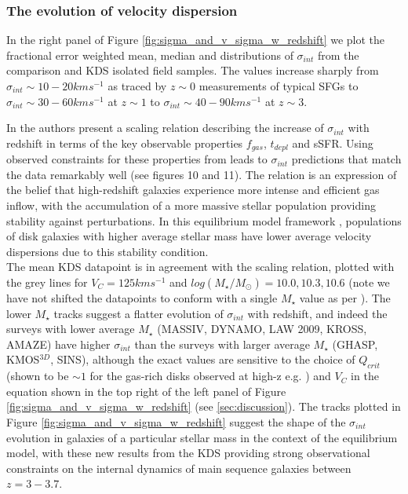 \documentclass[fleqn,usenatbib]{mn2e}
\begin{document}
\subsubsection{The evolution of velocity dispersion}\label{subsubsec:sigma_evolution}

In the right panel of Figure \ref{fig:sigma_and_v_sigma_w_redshift} we plot the fractional error weighted mean, median and distributions of $\sigma_{int}$ from the comparison and KDS isolated field samples.
The values increase sharply from $\sigma_{int} \sim 10-20kms^{-1}$ as traced by $z\sim0$ measurements of typical SFGs to $\sigma_{int} \sim 30-60kms^{-1}$ at $z\sim1$ to $\sigma_{int} \sim 40-90kms^{-1}$ at $z\sim3$.

In \cite{Wisnioski2015} the authors present a scaling relation describing the increase of $\sigma_{int}$ with redshift in terms of the key observable properties $f_{gas}$, $t_{depl}$ and sSFR.
Using observed constraints for these properties from \cite{Tacconi2013} leads to $\sigma_{int}$ predictions that match the data remarkably well (see \cite{Wisnioski2015} figures 10 and 11).
The relation is an expression of the belief that high-redshift galaxies experience more intense and efficient gas inflow, with the accumulation of a more massive stellar population providing stability against perturbations.
In this equilibrium model framework \citep[e.g.][]{Dave2012,Lilly2013,Saintonge2013}, populations of disk galaxies with higher average stellar mass have lower average velocity dispersions due to this stability condition.  \\

The mean KDS datapoint is in agreement with the scaling relation, plotted with the grey lines for $V_{C} = 125kms^{-1}$ and $log(M_{\star}/M_{\odot})=10.0,10.3,10.6$ (note we have not shifted the datapoints to conform with a single $M_{\star}$ value as per \cite{Wisnioski2015}).
The lower $M_{\star}$ tracks suggest a flatter evolution of $\sigma_{int}$ with redshift, and indeed the surveys with lower average $M_{\star}$ (MASSIV, DYNAMO, LAW 2009, KROSS, AMAZE) have higher $\sigma_{int}$ than the surveys with larger average $M_{\star}$ (GHASP, KMOS$^{3D}$, SINS), although the exact values are sensitive to the choice of $Q_{crit}$ (shown to be $\sim1$ for the gas-rich disks observed at high-z e.g. \citealt{ForsterSchreiber2006,Genzel2011,Newman2013}) and $V_{C}$ in the equation shown in the top right of the left panel of Figure \ref{fig:sigma_and_v_sigma_w_redshift} (see \cref{sec:discussion}).
The tracks plotted in Figure \ref{fig:sigma_and_v_sigma_w_redshift} suggest the shape of the $\sigma_{int}$ evolution in galaxies of a particular stellar mass in the context of the equilibrium model, with these new results from the KDS providing strong observational constraints on the internal dynamics of main sequence galaxies between $z=3-3.7$.
\end{document}
